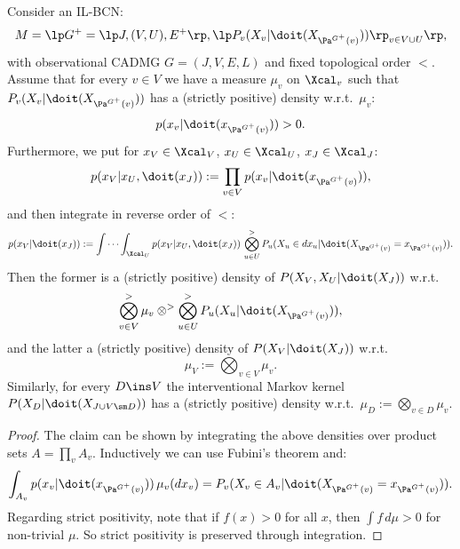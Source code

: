\begin{Lem}
    \label{lem:cbn-str-pos-density}
    Consider an IL-BCN:
        \[M= \lp G^+=\lp J,(V,U),E^+ \rp, \lp P_v ( X_v|\doit( X_{\Pa^{G^+}(v)})) \rp_{v \in V \cup U} \rp,\]
        with observational CADMG $G=(J,V,E,L)$ and fixed topological order $<$.
    Assume that for every $v \in V$ we have a measure $\mu_v$ on $\Xcal_v$ such that $P_v ( X_v|\doit( X_{\Pa^{G^+}(v)}))$
    has a (strictly positive) density w.r.t.\ $\mu_v$:
    \[ p(x_v|\doit(x_{\Pa^{G^+}(v)})) > 0. \]
    Furthermore, we put for $x_V \in \Xcal_V$, $x_U \in \Xcal_U$, $x_J \in \Xcal_J$:
    \[ p(x_V|x_U,\doit(x_J)) := \prod_{v \in V} p(x_v|\doit(x_{\Pa^{G^+}(v)})),  \]
    and then integrate in reverse order of $<$:
    \[ p(x_V|\doit(x_J)) := \idotsint_{\Xcal_U} p(x_V|x_U,\doit(x_J)) \, 
    \bigotimes_{ u \in U}^> P_u (X_u \in dx_u|\doit( X_{\Pa^{G^+}(v)} = x_{\Pa^{G^+}(v)} )).   \]
    Then the former is a (strictly positive) density of $P(X_V,X_U|\doit(X_J))$ w.r.t.\ 
    \[ \bigotimes_{ v \in V}^> \mu_v \otimes^> \bigotimes_{ u \in U}^> P_u (X_u|\doit( X_{\Pa^{G^+}(v)} )), \]
    and the latter a (strictly positive) density of $P(X_V|\doit(X_J))$ w.r.t.\ 
    \[ \mu_V := \bigotimes_{ v \in V} \mu_v. \]
    Similarly, for every $D \ins V$ the interventional Markov kernel $P(X_D|\doit(X_{J \cup V \sm D}))$ has
    a (strictly positive) density w.r.t.\ $\mu_D:=\bigotimes_{ v \in D} \mu_v$.
    \begin{proof}
    The claim can be shown by integrating the above densities over product sets $A = \prod_v A_v$.
    Inductively we can use Fubini's theorem and:
    \[ \int_{A_v} p(x_v|\doit(x_{\Pa^{G^+}(v)}))\, \mu_v(dx_v) = P_v(X_v \in A_v|\doit( X_{\Pa^{G^+}(v)}=x_{\Pa^{G^+}(v)})).\]
     Regarding strict positivity, note that if $f(x) > 0$ for all $x$, then $\int f\, d\mu >0$ for non-trivial $\mu$. 
        So strict positivity is preserved through integration.
    \end{proof}
\end{Lem}

